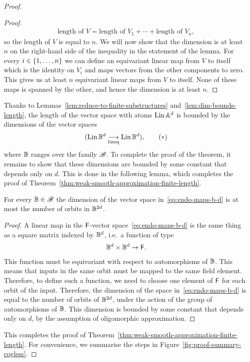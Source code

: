 \begin{proof}
\begin{proof}
\begin{align*}
            \text{length of $V$} = \text{length of $V_1$} + \cdots + \text{length of $V_n$},
        \end{align*}
        so the length of $V$ is equal to $n$.  We will now show that the dimension is at least $n$ on the right-hand side of the inequality in the statement of the lemma.
        For every $i \in \{1,\ldots,n\}$ we can define an equivariant linear map from $V$ to itself which is the identity on $V_i$ and maps vectors from the other components to zero.  This gives us  at least $n$ equivariant linear maps from $V$ to itself. None of these maps is spanned by the other, and hence the dimension is at least $n$. 
    \end{proof}

    Thanks to Lemmas~\ref{lem:reduce-to-finite-substructures} and~\ref{lem:dim-bounds-length}, the length of the vector space with atoms $\operatorname{Lin} \mathbb{A}^d$ is bounded by the dimensions of the vector spaces
    \begin{align}
        \label{eq:endo-maps-b-d}
 ( \operatorname{Lin} \mathbb{B}^d \underset{\textup{lineq}}{\longrightarrow} \operatorname{Lin} \mathbb{B}^d),\tag{$*$}
    \end{align}
    where $\mathbb{B}$ ranges over the family $\mathscr{B}$.
    To complete the proof of the theorem, it remains to show that these dimensions  are bounded by some constant that depends only on $d$. This is done in the following lemma, which   completes the    proof of Theorem~\ref{thm:weak-smooth-approximation-finite-length}. 

    \begin{lemma}\label{lem:bound-on-dim-for-finite-set} 
        For every  $\mathbb{B} \in \mathscr{B}$ the dimension of the vector space  in~\eqref{eq:endo-maps-b-d} is at most the number of orbits in $\mathbb{B}^{2d}$.
    \end{lemma}
    \begin{proof}
        A linear map  in the $\mathsf{F}$-vector space~\eqref{eq:endo-maps-b-d} is the same thing as a square matrix indexed by $\mathbb{B}^d$, i.e.~a function of type  
        \begin{align*}
        {\mathbb{B}^d \times \mathbb{B}^d} \to \mathsf{F}.
        \end{align*}
        This function must be equivariant with respect to automorphisms of $\mathbb{B}$. This means that inputs in the same orbit must be mapped to the same field element. Therefore, to define  such a function, we need to choose one element of $\mathsf{F}$ for each orbit of the input.   Therefore, the dimension of the space in~\eqref{eq:endo-maps-b-d} is equal to the number of orbits of $\mathbb{B}^{2d}$, under the action of the group of automorphisms of $\mathbb{B}$.  This dimension is bounded by some constant that depends only on $d$, by the assumption of oligomorphic approximation. 
    \end{proof}
This completes the proof of Theorem~\ref{thm:weak-smooth-approximation-finite-length}. For convenience, we summarise the steps  in Figure~\ref{fig:proof-summary-cogless}.
\end{proof}


